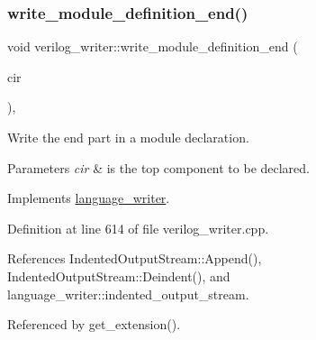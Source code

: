 \subsubsection{\texorpdfstring{write\+\_\+module\+\_\+definition\+\_\+end()}{write\_module\_definition\_end()}}
{\footnotesize\ttfamily void verilog\+\_\+writer\+::write\+\_\+module\+\_\+definition\+\_\+end (\begin{DoxyParamCaption}\item[{const \hyperlink{structural__objects_8hpp_a8ea5f8cc50ab8f4c31e2751074ff60b2}{structural\+\_\+object\+Ref} \&}]{cir }\end{DoxyParamCaption})\hspace{0.3cm}{\ttfamily [override]}, {\ttfamily [virtual]}}



Write the end part in a module declaration. 


\begin{DoxyParams}{Parameters}
{\em cir} & is the top component to be declared. \\
\hline
\end{DoxyParams}


Implements \hyperlink{classlanguage__writer_a57586ab4a2816a9eeb3658b9f072d02d}{language\+\_\+writer}.



Definition at line 614 of file verilog\+\_\+writer.\+cpp.



References Indented\+Output\+Stream\+::\+Append(), Indented\+Output\+Stream\+::\+Deindent(), and language\+\_\+writer\+::indented\+\_\+output\+\_\+stream.



Referenced by get\+\_\+extension().

